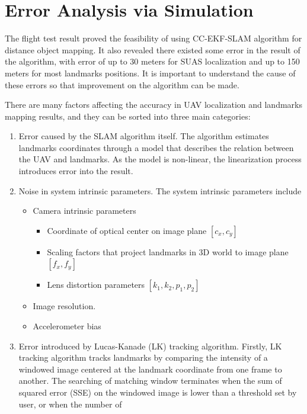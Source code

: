 \chapter{Error Analysis via Simulation}\label{ch:simulation}
The flight test result proved the feasibility of using CC-EKF-SLAM
algorithm for distance object mapping. It also revealed there existed
some error in the result of the algorithm, with error of up to 30
meters for SUAS localization and up to 150 meters for most landmarks
positions. It is important to understand the cause of these errors so
that improvement on the algorithm can be made.

There are many factors affecting the accuracy in UAV localization and
landmarks mapping results, and they can be sorted into three main
categories:

\begin{enumerate}
  \item Error caused by the SLAM algorithm itself. The algorithm
  estimates landmarks coordinates through a model that describes the
  relation between the UAV and landmarks. As the model is non-linear,
  the linearization process introduces error into the result.
  \item Noise in system intrinsic parameters. The system intrinsic
  parameters include
  \begin{itemize}
    \item Camera intrinsic parameters
    \begin{itemize}
      \item Coordinate of optical center on image plane $[c_{x}, c_{y}]$
      \item Scaling factors that project landmarks in 3D world to image plane $ [f_{x}, f_{y}]$
      \item Lens distortion parameters $[k_{1}, k_{2}, p_{1}, p_{2}]$
    \end{itemize}
    \item Image resolution.
    \item Accelerometer bias %
  \end{itemize}
  \item Error introduced by Lucas-Kanade (LK) tracking algorithm.
  Firstly, LK tracking algorithm tracks landmarks by comparing the
  intensity of a windowed image centered at the landmark coordinate
  from one frame to another. The searching of matching window
  terminates when the sum of squared error (SSE) on the windowed image
  is lower than a threshold set by user, or when the number of

\end{enumerate}
